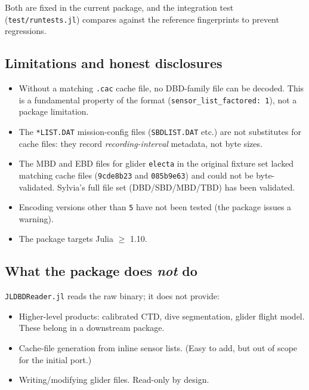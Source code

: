 \documentclass[11pt]{article}
\begin{document}
Both are fixed in the current package, and the integration test
(\texttt{test/runtests.jl}) compares against the reference fingerprints to
prevent regressions.

\subsection{Limitations and honest disclosures}

\begin{itemize}[leftmargin=*,topsep=1pt,itemsep=0pt]
  \item Without a matching \texttt{.cac} cache file, no DBD-family file can
        be decoded.  This is a fundamental property of the format
        (\texttt{sensor\_list\_factored: 1}), not a package limitation.
  \item The \texttt{*LIST.DAT} mission-config files (\texttt{SBDLIST.DAT}
        etc.) are not substitutes for cache files: they record
        \emph{recording-interval} metadata, not byte sizes.
  \item The MBD and EBD files for glider \texttt{electa} in the original
        fixture set lacked matching cache files (\texttt{9cde8b23} and
        \texttt{085b9e63}) and could not be byte-validated.  Sylvia's
        full file set (DBD/SBD/MBD/TBD) has been validated.
  \item Encoding versions other than \texttt{5} have not been tested
        (the package issues a warning).
  \item The package targets Julia $\geq$ 1.10.
\end{itemize}

\subsection{What the package does \emph{not} do}

\texttt{JLDBDReader.jl} reads the raw binary; it does not provide:
\begin{itemize}[leftmargin=*,topsep=1pt,itemsep=0pt]
  \item Higher-level products: calibrated CTD, dive segmentation, glider
        flight model.  These belong in a downstream package.
  \item Cache-file generation from inline sensor lists.  (Easy to add, but
        out of scope for the initial port.)
  \item Writing/modifying glider files.  Read-only by design.
\end{itemize}
\end{document}
